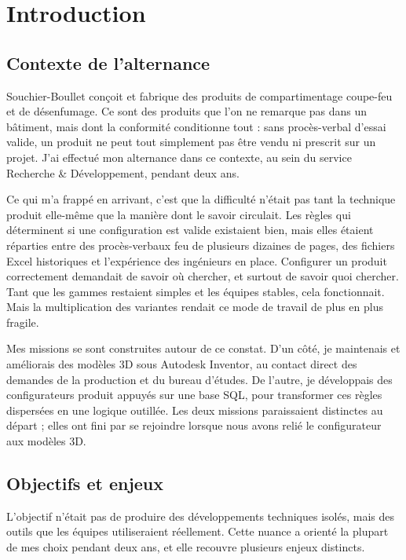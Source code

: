 \chapter{Introduction}

\section{Contexte de l'alternance}

Souchier-Boullet conçoit et fabrique des produits de compartimentage coupe-feu et de désenfumage. Ce sont des produits que l'on ne remarque pas dans un bâtiment, mais dont la conformité conditionne tout : sans procès-verbal d'essai valide, un produit ne peut tout simplement pas être vendu ni prescrit sur un projet. J'ai effectué mon alternance dans ce contexte, au sein du service Recherche \& Développement, pendant deux ans.

Ce qui m'a frappé en arrivant, c'est que la difficulté n'était pas tant la technique produit elle-même que la manière dont le savoir circulait. Les règles qui déterminent si une configuration est valide existaient bien, mais elles étaient réparties entre des procès-verbaux feu de plusieurs dizaines de pages, des fichiers Excel historiques et l'expérience des ingénieurs en place. Configurer un produit correctement demandait de savoir où chercher, et surtout de savoir quoi chercher. Tant que les gammes restaient simples et les équipes stables, cela fonctionnait. Mais la multiplication des variantes rendait ce mode de travail de plus en plus fragile.

Mes missions se sont construites autour de ce constat. D'un côté, je maintenais et améliorais des modèles 3D sous Autodesk Inventor, au contact direct des demandes de la production et du bureau d'études. De l'autre, je développais des configurateurs produit appuyés sur une base SQL, pour transformer ces règles dispersées en une logique outillée. Les deux missions paraissaient distinctes au départ ; elles ont fini par se rejoindre lorsque nous avons relié le configurateur aux modèles 3D.

\section{Objectifs et enjeux}

L'objectif n'était pas de produire des développements techniques isolés, mais des outils que les équipes utiliseraient réellement. Cette nuance a orienté la plupart de mes choix pendant deux ans, et elle recouvre plusieurs enjeux distincts.

